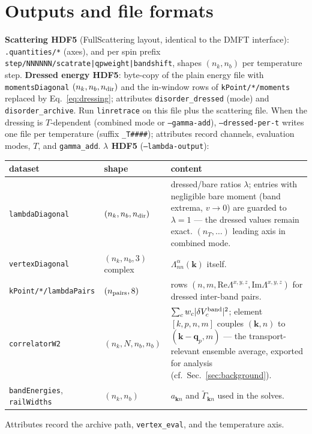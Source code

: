 \documentclass[11pt]{article}
\newcommand{\vk}{\mathbf{k}}
\newcommand{\vq}{\mathbf{q}}
\newcommand{\Gam}{\Gamma}
\begin{document}
\section{Outputs and file formats}
\label{sec:outputs}
\textbf{Scattering HDF5} (FullScattering layout, identical to the DMFT
interface): \texttt{.quantities/*} (axes), and per spin prefix
\texttt{step/NNNNNN/scatrate|qpweight|bandshift}, shapes
$(n_k,n_b)$ per temperature step.
\textbf{Dressed energy HDF5}: byte-copy of the plain energy file with
\texttt{momentsDiagonal} $(n_k,n_b,n_{\rm dir})$ and the in-window rows
of \texttt{kPoint/*/moments} replaced by Eq.~\eqref{eq:dressing};
attributes \texttt{disorder\_dressed} (mode) and
\texttt{disorder\_archive}.  Run \texttt{linretrace} on this file plus
the scattering file.  When the dressing is $T$-dependent (combined mode
or \texttt{--gamma-add}), \texttt{--dressed-per-t} writes one file per
temperature (suffix \texttt{\_T\#\#\#\#}); attributes record channels,
evaluation modes, $T$, and \texttt{gamma\_add}.
\textbf{$\lambda$ HDF5} (\texttt{--lambda-output}):
\begin{center}\small
\begin{tabular}{@{}llp{7.2cm}@{}}
\toprule
dataset & shape & content \\
\midrule
\texttt{lambdaDiagonal} & $(n_k,n_b,n_{\rm dir})$ &
dressed/bare ratios $\lambda$; entries with negligible bare moment
(band extrema, $v\to0$) are guarded to $\lambda=1$ --- the dressed
values remain exact.  $(n_T,\dots)$ leading axis in combined mode. \\
\texttt{vertexDiagonal} & $(n_k,n_b,3)$ complex &
$\Lambda^{\alpha}_{nn}(\vk)$ itself. \\
\texttt{kPoint/*/lambdaPairs} & $(n_{\rm pairs},8)$ &
rows $(n,m,\mathrm{Re}\Lambda^{x,y,z},\mathrm{Im}\Lambda^{x,y,z})$ for
dressed inter-band pairs. \\
\texttt{correlatorW2} & $(n_k,N,n_b,n_b)$ &
$\sum_c w_c|\delta V^{\rm band}_c|^2$; element $[k,p,n,m]$ couples
$(\vk,n)$ to $(\vk-\vq_p,m)$ --- the transport-relevant ensemble
average, exported for analysis (cf.\ Sec.~\ref{sec:background}). \\
\texttt{bandEnergies}, \texttt{railWidths} & $(n_k,n_b)$ &
$a_{\vk n}$ and $\tilde\Gam_{\vk n}$ used in the solves. \\
\bottomrule
\end{tabular}
\end{center}
Attributes record the archive path, \texttt{vertex\_eval}, and the
temperature axis.
\end{document}
